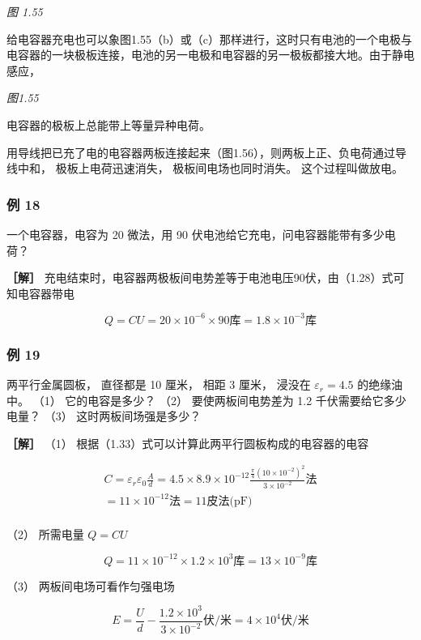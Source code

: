 \emph{图 1.55}

给电容器充电也可以象图1.55（b）或（c）那样进行，这时只有电池的一个电极与电容器的一块极板连接，电池的另一电极和电容器的另一极板都接大地。由于静电感应，

\emph{图1.55}

电容器的极板上总能带上等量异种电荷。

用导线把已充了电的电容器两板连接起来（图1.56），则两板上正、负电荷通过导线中和，
极板上电荷迅速消失， 极板间电场也同时消失。 这个过程叫做放电。

\subsubsection{例 18}\label{ux4f8b-18-1}

一个电容器，电容为 20 微法，用 90
伏电池给它充电，问电容器能带有多少电荷？

\textbf{［解］}
充电结束时，电容器两极板间电势差等于电池电压90伏，由（1.28）式可知电容器带电

\[
Q = C U = 20 \times 10^{- 6} \times 90 \text{库} = 1.8 \times 10^{- 3} \text{库}
\]

\subsubsection{例 19}\label{ux4f8b-19}

两平行金属圆板， 直径都是 10 厘米， 相距 3 厘米， 浸没在
\(\varepsilon_{r}=4.5\) 的绝缘油中。 （1） 它的电容是多少？ （2）
要使两板间电势差为 1.2 千伏需要给它多少电量？ （3）
这时两板间场强是多少？

\textbf{［解］} （1）
根据（1.33）式可以计算此两平行圆板构成的电容器的电容

\[
\begin{array}{l} C = \varepsilon_{r} \varepsilon_{0} \frac{A}{d} = 4.5 \times 8.9 \times 10^{- 12} \frac{\frac{\pi}{4} (10\times10^{-2})^{2}}{3 \times 10^{- 2}} \text{法} \\ = 11 \times 10^{- 12} \text{法} = 11 \text{皮法(pF)} \\ \end{array}
\]

（2） 所需电量 \(Q = CU\)

\[
Q = 11 \times 10^{- 12} \times 1.2 \times 10^{3} \text{库} = 13 \times 10^{- 9} \text{库}
\]

（3） 两板间电场可看作匀强电场

\[
E = \frac{U}{d} - \frac{1.2 \times 10^{3}}{3 \times 10^{- 2}} \text{伏/米} = 4 \times 10^{4} \text{伏/米}
\]

